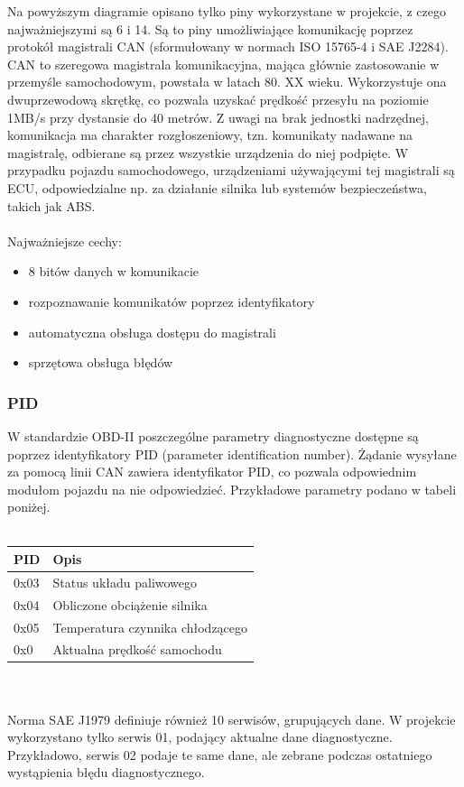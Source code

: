 \documentclass[10pt,a4paper]{scrartcl}
\begin{document}
		Na powyższym diagramie opisano tylko piny wykorzystane w projekcie, z czego najważniejszymi są 6 i 14. Są to piny umożliwiające komunikację poprzez protokół magistrali CAN (sformułowany w normach ISO 15765-4 i SAE J2284).\\
		CAN to szeregowa magistrala komunikacyjna, mająca głównie zastosowanie w przemyśle samochodowym, powstała w latach 80. XX wieku. Wykorzystuje ona dwuprzewodową skrętkę, co pozwala uzyskać prędkość przesyłu na poziomie 1MB/s przy dystansie do 40 metrów. Z uwagi na brak jednostki nadrzędnej, komunikacja ma charakter rozgłoszeniowy, tzn. komunikaty nadawane na magistralę, odbierane są przez wszystkie urządzenia do niej podpięte. W przypadku pojazdu samochodowego, urządzeniami używającymi tej magistrali są ECU, odpowiedzialne np. za działanie silnika lub systemów bezpieczeństwa, takich jak ABS.\\ \\ Najważniejsze cechy:
		\begin{itemize}
			\item 8 bitów danych w komunikacie
			\item rozpoznawanie komunikatów poprzez identyfikatory
			\item automatyczna obsługa dostępu do magistrali
			\item sprzętowa obsługa błędów
		\end{itemize}
		
		\subsubsection{PID}
		W standardzie OBD-II poszczególne parametry diagnostyczne dostępne są poprzez identyfikatory PID (parameter identification number). Żądanie wysyłane za pomocą linii CAN zawiera identyfikator PID, co pozwala odpowiednim modułom pojazdu na nie odpowiedzieć. Przykładowe parametry podano w tabeli poniżej. \\\\
		\begin{tabular}{|l|l|}
			\hline
			PID & Opis \\
			\hline
			0x03 & Status układu paliwowego \\
			\hline
			0x04 & Obliczone obciążenie silnika \\
			\hline
			0x05 & Temperatura czynnika chłodzącego\\			
			\hline
			0x0 & Aktualna prędkość samochodu \\			
			\hline
		\end{tabular}
		\\\\
		Norma SAE J1979 definiuje również 10 serwisów, grupujących dane. W projekcie wykorzystano tylko serwis 01, podający aktualne dane diagnostyczne. Przykładowo, serwis 02 podaje te same dane, ale zebrane podczas ostatniego wystąpienia błędu diagnostycznego.
\end{document}
